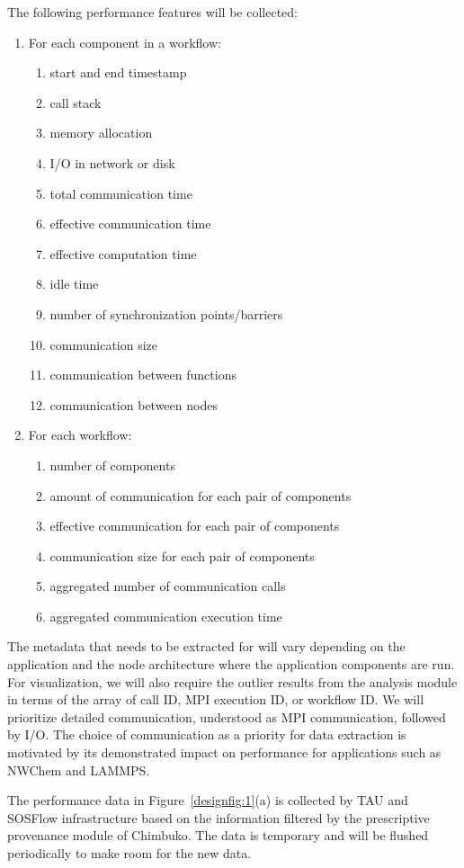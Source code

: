 The following performance features will be collected:
\begin{enumerate}
\item For each component in a workflow:
\begin{enumerate}
\item start and end timestamp
\item call stack
\item memory allocation
\item I/O in network or disk
\item total communication time
\item effective communication time
\item effective computation time
\item idle time
\item number of synchronization points/barriers
\item communication size
\item communication between functions
\item communication between nodes
\end{enumerate}
\item For each workflow:
\begin{enumerate}
\item number of components
\item amount of communication for each pair of components
\item effective communication for each pair of components
\item communication size for each pair of components
\item aggregated number of communication calls 
\item aggregated communication execution time
\end{enumerate}
\end{enumerate}
The metadata that needs to be extracted for will vary depending on the application and the node architecture where the application components are run.
For visualization, we will also require the outlier results from the analysis module in terms of the array of call ID, MPI execution ID, or workflow ID.  
We will prioritize detailed communication, understood as MPI communication, followed by I/O.  The choice of communication as a priority for data extraction is motivated by its demonstrated impact on performance for applications such as NWChem and LAMMPS. 

The performance data in Figure~\ref{designfig:1}(a) is collected by TAU and SOSFlow infrastructure based on the information filtered by the prescriptive provenance module of Chimbuko. The data is temporary and will be flushed periodically to make room for the new data.


